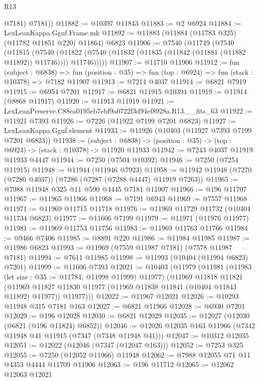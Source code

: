 \begin{lexlean}{R13}
\begin{coremodule}
          @7181)
        @7181))
@11882 := @10397 @11843
@11883 := @2 @6924
@11884 := LexLeanKappa.Gguf.Frame.mk
@11892 := @11883 (@11884 (@11783 @325) (@11782 @11851 @220) @11864) @6823
@11906 := @7540
    (@11749
      (@7540
        (@11815
          (@7540
            (@11822 (@7540 (@11832 (@11835 (@11842 (@11881 (@11882 @11892)) @11746)))) @11746)))))
@11907 := @11710 @11906
@11912 := fun (subject : @6838) =>
  fun (position : @35) => fun (top : @6924) => fun (stack : @10378) => @7182 @11907
@11913 := @7214 @4037
@11914 := @6821 @7919
@11915 := @6954 @7201
@11917 := @6821 @11915 @10394
@11919 := @11914 (@8868 @11917)
@11920 := @11913 @11919
@11921 := LexLeanPreserve.C88ea0195eb7ebf9a0722f3d94ef8928a.R13.__fits_63
@11922 := @11921 @7393
@11926 := @7226 (@11922 @7199 @7201 @6823)
@11927 := LexLeanKappa.Gguf.element
@11933 := @11926 (@10403 (@11927 @7393 @7199 @7201 @6823))
@11938 := (subject : @6838) ->
  (position : @35) -> (top : @6924) -> (stack : @10378) -> @11920 @11933
@11942 := @7243 @4037 @11919 @11933 @4447
@11944 := @7250 (@7504 @10392)
@11946 := @7250 (@7254 @11915)
@11948 := @11944 (@11946 @7923)
@11958 := @11942 @11948 (@7270 (@7280 @4037)) (@7286 (@7287 (@7288 @4447) @11919 @7263))
@11965 := @7988 @11948 @325 @11 @590 @4445 @7181 @11907
@11966 := @196 @11707
@11967 := @11965 @11966
@11968 := @7191 @6943
@11969 := @7557 @11968
@11971 := @11969 @11715 @11718
@11976 := @11969 @11729 @11732 (@10404 @11734 @6823)
@11977 := @11606 @7199
@11979 := @11971 (@11976 @11977)
@11981 := @11969 @11753 @11756
@11983 := @11969 @11763 @11766
@11984 := @9466 @7406
@11985 := @8891 @220
@11986 := @11984 @11985
@11987 := @11986 @6823
@11993 := @11969 (@7559 @11987 @7181) (@7578 @11987 @7181)
@11994 := @7611 @11985
@11998 := @11993 (@10404 (@11994 @6823) @7201)
@11999 := @11606 @7393
@12021 := @10403
    (@11979
      (@11981
        (@11983 (let size : @35 := @11784; @11998 @11999) @11977)
        (@11969
          @11818
          @11821
          (@11969 @11827 @11830 @11977 (@11969 @11838 @11841 (@10404 @11843 @11892) @11977))
          @11977)))
@12022 := @11967 @12021
@12026 := @10293 @11948 @315 @7181 @163
@12027 := @6821 @11966
@12028 := @6930 @7201
@12029 := @196 @12028
@12030 := @6821 @12029
@12035 := @12027 (@12030 (@6821 (@196 @11824) @6852))
@12046 := @12026 @12035 @163 @11966 (@7342 @11948 @41 @11915 (@7347 (@7348 @11948 @41)))
@12047 := @10312 @12035
@12051 := @12022 (@12046 (@7347 (@12047 @163)))
@12052 := @7253 @325
@12055 := @7250 (@12052 @11966) @11948
@12062 := @7988 @12055 @71 @11 @4353 @4444 @11709 @11906
@12063 := @196 @11712
@12065 := @12062 @12063 @12021

\end{coremodule}
\end{lexlean}
